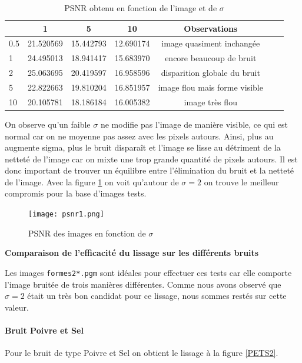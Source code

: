 \documentclass[paper=a4, fontsize=11pt]{scrartcl} %
\begin{document}
\begin{table}[h!]
\caption{PSNR obtenu en fonction de l'image et de $\sigma$}
\begin{tabular}{|l|c|c|c|c|c|c|}

	\hline
	\backslashbox{$\sigma$}{Numéro image} & 1 & 5 & 10 & Observations\\ 
	\hline
	
	0.5 & 21.520569 & 15.442793 & 12.690174 & image quasiment inchangée \\
	\hline
	1 & 24.495013 & 18.941417 & 15.683970 & encore beaucoup de bruit\\
	\hline
	2 & 25.063695 & 20.419597 & 16.958596 &  disparition globale du bruit \\
	\hline
	5 & 22.822663 & 19.810204 & 16.851957 & image flou mais forme visible \\ 
	\hline
	10 & 20.105781  & 18.186184 & 16.005382 & image très flou \\
	\hline

\end{tabular}

\end{table}
On observe qu'un faible $\sigma$ ne modifie pas l'image de manière visible, ce qui est normal car on ne moyenne pas assez avec les pixels autours. Ainsi, plus au augmente sigma, plus le bruit disparaît et l'image se lisse au détriment de la netteté de l'image car on mixte une trop grande quantité de pixels autours. Il est donc important de trouver un équilibre entre l'élimination du bruit et la netteté de l'image. Avec la figure \ref{tracer1} on voit qu'autour de $\sigma=2$ on trouve le meilleur compromis pour la base d'images tests.

\begin{figure}[h!]
\centering
\caption{PSNR des images en fonction de $\sigma$}
\label{tracer1}
\texttt{[image: psnr1.png]}
\end{figure}


\newpage

\textbf{Comparaison de l'efficacité du lissage sur les différents bruits}

Les images \texttt{formes2*.pgm} sont idéales pour effectuer ces tests car elle comporte l'image bruitée de trois manières différentes. Comme nous avons observé que $\sigma=2$ était un très bon candidat pour ce lissage, nous sommes restés sur cette valeur.

\paragraph{Bruit Poivre et Sel}
Pour le bruit de type Poivre et Sel on obtient le lissage à la figure \ref{PETS2}.
\end{document}
